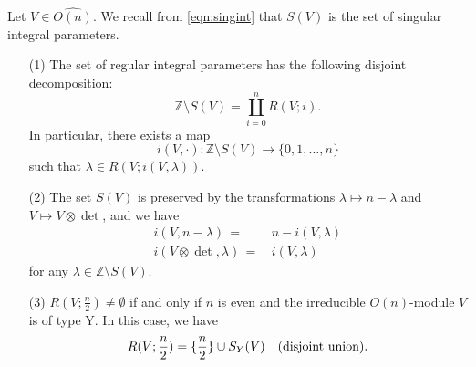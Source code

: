 \begin{lemma}
\label{lem:ilsig}
Let $V \in \widehat{O(n)}$.  
We recall from \eqref{eqn:singint}
 that $S(V)$ is the set of singular integral parameters.  
\begin{enumerate}
\item[{\rm{(1)}}]
The set of regular integral parameters has the following disjoint decomposition:
\[
{\mathbb{Z}} \setminus S(V)
=
\coprod_{i=0}^n R(V;i). 
\]
In particular,
 there exists a map
\begin{equation}
\label{eqn:indexV}
   i(V, \cdot) \colon {\mathbb{Z}} \setminus S(V) \to \{0,1,\ldots,n\}
\end{equation}
such that $\lambda \in R(V;i(V, \lambda))$.  
\item[{\rm{(2)}}]
The set $S(V)$ is preserved
 by the transformations $\lambda \mapsto n-\lambda$
 and $V \mapsto V \otimes \det$, 
 and we have 
\begin{align*}
i(V,n-\lambda)\,=\,&n-i(V,\lambda)
\\
i(V \otimes \det ,\lambda)\,=\,&i(V,\lambda)
\end{align*}
for any $\lambda\in {\mathbb{Z}} \setminus S(V)$.    
\item[{\rm{(3)}}]
$R(V;\frac n 2) \ne \emptyset$
 if and only if $n$ is even and the irreducible $O(n)$-module $V$ 
 is of type Y.  
In this case,
 we have
\begin{equation}
\label{eqn:RSYV}
R(V;\frac n 2)=\{\frac n 2\} \cup S_Y(V)
\quad
\text{{\rm{(disjoint union).}}}
\end{equation}
\end{enumerate}
\end{lemma}

